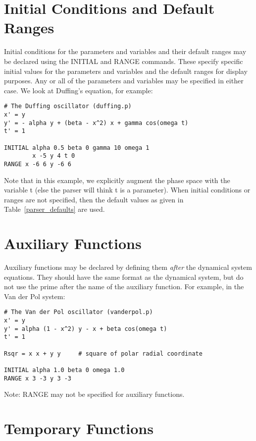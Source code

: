 \section{Initial Conditions and Default Ranges}

Initial conditions for the parameters and variables and their default
ranges may be declared using the INITIAL and RANGE commands.  These specify
specific initial values for the parameters and variables and the default ranges
for display purposes.  Any or all of the parameters and variables may
be specified in either case.  We look at Duffing's equation, for example:

\begin{verbatim}
# The Duffing oscillator (duffing.p)
x' = y
y' = - alpha y + (beta - x^2) x + gamma cos(omega t)
t' = 1

INITIAL alpha 0.5 beta 0 gamma 10 omega 1
        x -5 y 4 t 0
RANGE x -6 6 y -6 6
\end{verbatim}

Note that in this example, we explicitly augment the phase space
with the variable t (else the parser will think t is a parameter).
When initial conditions or ranges are not specified, then the default
values as given in Table~\ref{parser_defaults} are used.


\section{Auxiliary Functions}

Auxiliary functions may be declared by defining them {\em after} the dynamical system equations.
They should have the same format as the dynamical system, but do not use the prime
after the name of the auxiliary function.   For example, in the Van der Pol system:

\begin{verbatim}
# The Van der Pol oscillator (vanderpol.p)
x' = y 
y' = alpha (1 - x^2) y - x + beta cos(omega t)
t' = 1

Rsqr = x x + y y     # square of polar radial coordinate

INITIAL alpha 1.0 beta 0 omega 1.0
RANGE x 3 -3 y 3 -3
\end{verbatim}

Note: RANGE may not be specified for auxiliary functions.

\section{Temporary Functions}

